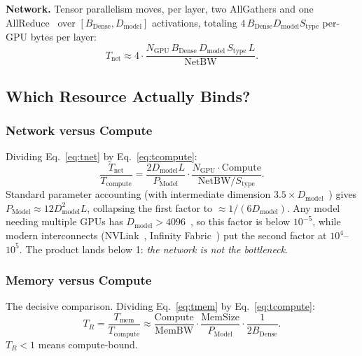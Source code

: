 \documentclass[manuscript,review]{acmart}
\newcommand{\Bdense}{B_{\mathrm{Dense}}}
\newcommand{\Pmodel}{P_{\mathrm{Model}}}
\newcommand{\Dmodel}{D_{\mathrm{model}}}
\newcommand{\membw}{\mathrm{MemBW}}
\newcommand{\memsize}{\mathrm{MemSize}}
\newcommand{\compute}{\mathrm{Compute}}
\newcommand{\netbw}{\mathrm{NetBW}}
\begin{document}
\textbf{Network.} Tensor parallelism moves, per layer, two AllGathers and one
AllReduce~\cite{shoeybi2020megatron_b} over $[\Bdense, \Dmodel]$ activations,
totaling $4\,\Bdense \Dmodel S_{\mathrm{type}}$ per-GPU bytes per layer:
\begin{equation}
  T_{\mathrm{net}} \approx 4 \cdot
    \frac{N_{\mathrm{GPU}}\, \Bdense\, \Dmodel\, S_{\mathrm{type}}\, L}{\netbw}.
  \label{eq:tnet}
\end{equation}

\subsection{Which Resource Actually Binds?}
\label{sec:classification}

\subsubsection{Network versus Compute}

Dividing Eq.~\ref{eq:tnet} by Eq.~\ref{eq:tcompute}:
\begin{equation}
  \frac{T_{\mathrm{net}}}{T_{\mathrm{compute}}}
    = \frac{2 \Dmodel L}{\Pmodel} \cdot
      \frac{N_{\mathrm{GPU}} \cdot \compute}{\netbw / S_{\mathrm{type}}}.
  \label{eq:netratio}
\end{equation}
Standard parameter accounting (with intermediate dimension
$3.5\times\Dmodel$~\cite{jiang2023mistral, meta2024llama3}) gives
$\Pmodel \approx 12\Dmodel^2 L$, collapsing the first factor to
$\approx 1/(6\Dmodel)$. Any model needing multiple GPUs has
$\Dmodel > 4096$~\cite{cloud2024qwen2, jiang2023mistral, meta2024llama3,
touvron2023llama}, so this factor is below $10^{-5}$, while modern interconnects
(NVLink~\cite{nvidia2024nvlink}, Infinity Fabric~\cite{zhao2024forestcoll}) put
the second factor at $10^4$--$10^5$. The product lands below 1:
\emph{the network is not the bottleneck}.

\subsubsection{Memory versus Compute}

The decisive comparison. Dividing Eq.~\ref{eq:tmem} by Eq.~\ref{eq:tcompute}:
\begin{equation}
  T_R = \frac{T_{\mathrm{mem}}}{T_{\mathrm{compute}}}
      \approx \frac{\compute}{\membw} \cdot
              \frac{\memsize}{\Pmodel} \cdot
              \frac{1}{2 \Bdense}.
  \label{eq:tr}
\end{equation}
$T_R < 1$ means compute-bound.
\end{document}

